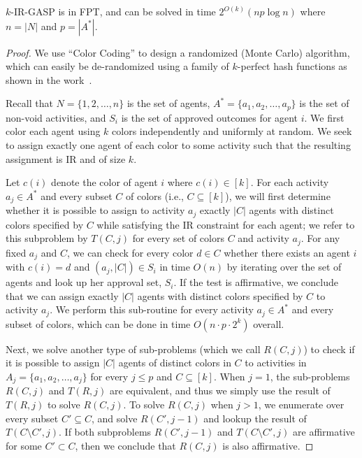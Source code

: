 \begin{theorem} \label{GASP:thm:k_IR_GASP_FPT}
$k$-IR-GASP is in FPT, and can be solved in time $2^{O(k)}(np \log n)$ where $n= |N|$ and $p = |A^*|$.
\end{theorem}
\begin{proof}
	We use ``Color Coding'' to design a randomized (Monte Carlo) algorithm, which can easily be de-randomized using a family of $k$-perfect hash functions as shown in the work~\cite{ColorCoding}.

	Recall that $N = \{1, 2, \dots, n\}$ is the set of agents, $A^* = \{a_1, a_2, \dots, a_p\}$ is the set of non-void activities, and $S_i$ is the set of approved outcomes for agent $i$. We first color each agent using $k$ colors independently and uniformly at random. We seek to assign exactly one agent of each color to some activity such that the resulting assignment is IR and of size $k$. 
	
	Let $c(i)$ denote the color of agent $i$ where $c(i) \in [k]$. 
	For each activity $a_j \in A^*$ and every subset $C$ of colors (i.e., $C \subseteq [k]$), we will first determine whether it is possible to assign to activity $a_j$ exactly $|C|$ agents with distinct colors specified by $C$ while satisfying the IR constraint for each agent; we refer to this subproblem by $T(C, j)$ for every set of colors $C$ and activity $a_j$. 
	For any fixed $a_j$ and $C$, we can check for every color $d\in C$ whether there exists an agent $i$ with $c(i) = d$ and $(a_j, |C|) \in S_i$ in time $O(n)$ by iterating over the set of agents and look up her approval set, $S_i$. If the test is affirmative, we conclude that we can assign exactly $|C|$ agents with distinct colors specified by $C$ to activity $a_j$. We perform this sub-routine for every activity $a_j\in A^*$ and every subset of colors, which can be done in time $O(n\cdot p \cdot 2^k)$ overall.
	
	Next, we solve another type of sub-problems (which we call $R(C, j)$) to check if it is possible to assign $|C|$ agents of distinct colors in $C$ to activities in $A_j = \{a_1, a_2, \dots, a_j\}$ for every $j\leq p$ and $C\subseteq [k]$. When $j = 1$, the sub-problems $R(C, j)$ and $T(R, j)$ are equivalent, and thus we simply use the result of $T(R, j)$ to solve $R(C, j)$. To solve $R(C, j)$ when $j>1$, we enumerate over every subset $C' \subseteq C$, and solve $R(C', j-1)$ and lookup the result of $T(C\setminus C', j)$. If both subproblems $R(C', j-1)$ and $T(C \setminus C', j)$ are affirmative for some $C' \subset C$, then we conclude that $R(C, j)$ is also affirmative.
	

\end{proof}
